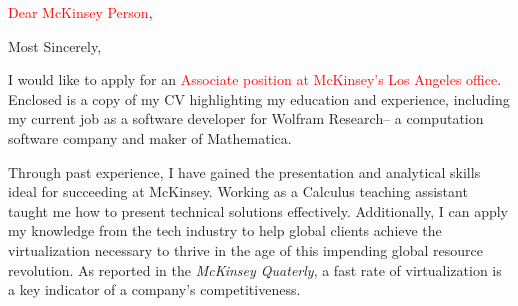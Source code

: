 \documentclass[11pt,a4paper,unicode]{moderncv}
\begin{document}



\iffalse
\clearpage

\date{\today} %
\opening{\textcolor{red}{Dear McKinsey Person},} %
\closing{Most Sincerely,} %

\makelettertitle %
	I would like to apply for an \textcolor{red}{Associate position at McKinsey's Los Angeles office}. Enclosed is a copy of my CV highlighting my education and experience, including my current job as a software developer for Wolfram Research-- a computation software company and maker of Mathematica. 
		
\vspace{3mm}  
Through past experience, I have gained the presentation and analytical skills ideal for succeeding at McKinsey. Working as a Calculus teaching assistant taught me how to present technical solutions effectively. Additionally, I can apply my knowledge from the tech industry to help global clients achieve the virtualization necessary to thrive in the age of this impending global resource revolution. As reported in the \emph{McKinsey Quaterly}, a fast rate of virtualization is a key indicator of a company's competitiveness. 
\end{document}
